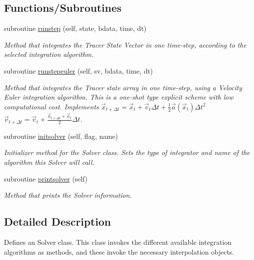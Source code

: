 \subsection*{Functions/\+Subroutines}
\begin{DoxyCompactItemize}
\item 
subroutine \mbox{\hyperlink{namespacesolver__mod_a75c5c8b01ae4ae193ff03dbe7e5fc6af}{runstep}} (self, state, bdata, time, dt)
\begin{DoxyCompactList}\small\item\em Method that integrates the Tracer State Vector in one time-\/step, according to the selected integration algorithm. \end{DoxyCompactList}\item 
subroutine \mbox{\hyperlink{namespacesolver__mod_a21533e195501ebb46c1814aeaede4c55}{runstepeuler}} (self, sv, bdata, time, dt)
\begin{DoxyCompactList}\small\item\em Method that integrates the Tracer state array in one time-\/step, using a Velocity Euler integration algorithm. This is a one-\/shot type explicit scheme with low computational cost. Implements $ {\vec {x}}_{t+\Delta t}={\vec {x}}_{t}+{\vec {v}}_{t}\Delta t+{\frac {1}{2}}{\vec {a}}({\vec {x}}_{t})\Delta t^{2}$ $ {\vec {v}}_{t+\Delta t}={\vec {v}}_{t}+\frac{{\vec {a}}_{t+\Delta t}+{\vec {a}}_{t}}{2}\Delta t$. \end{DoxyCompactList}\item 
subroutine \mbox{\hyperlink{namespacesolver__mod_a326292ff19880a914317109520b200b2}{initsolver}} (self, flag, name)
\begin{DoxyCompactList}\small\item\em Initializer method for the Solver class. Sets the type of integrator and name of the algorithm this Solver will call. \end{DoxyCompactList}\item 
subroutine \mbox{\hyperlink{namespacesolver__mod_a54ea6899cce026a7a5da2dd05922628f}{printsolver}} (self)
\begin{DoxyCompactList}\small\item\em Method that prints the Solver information. \end{DoxyCompactList}\end{DoxyCompactItemize}


\subsection{Detailed Description}
Defines an Solver class. This class invokes the different available integration algorithms as methods, and these invoke the necessary interpolation objects. 

